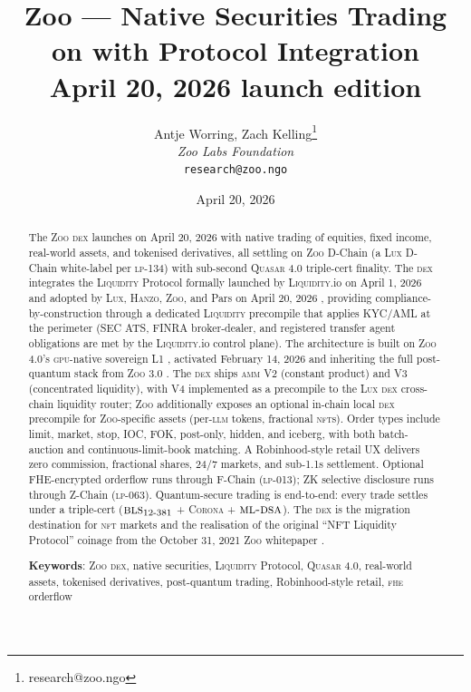 \documentclass[11pt,letterpaper]{article}
\title{\textbf{Zoo \DEX{} --- Native Securities Trading on \Lux{}
\Quasar{} with \Liquidity{} Protocol Integration}\\
\large April 20, 2026 launch edition}
\author{
Antje Worring, Zach Kelling\thanks{research@zoo.ngo}\\
\textit{Zoo Labs Foundation}\\
\texttt{research@zoo.ngo}
}
\date{April 20, 2026}
\newcommand{\Zoo}{\textsc{Zoo}}
\newcommand{\Lux}{\textsc{Lux}}
\newcommand{\Hanzo}{\textsc{Hanzo}}
\newcommand{\Quasar}{\textsc{Quasar}}
\newcommand{\Liquidity}{\textsc{Liquidity}}
\newcommand{\LLM}{\textsc{llm}}
\newcommand{\GPU}{\textsc{gpu}}
\newcommand{\AMM}{\textsc{amm}}
\newcommand{\DEX}{\textsc{dex}}
\newcommand{\NFT}{\textsc{nft}}
\newcommand{\FHE}{\textsc{fhe}}
\newcommand{\BLS}{\textsc{bls}}
\newcommand{\MLDSA}{\textsc{ml-dsa}}
\newcommand{\Corona}{\textsc{Corona}}
\begin{document}
\zoocoverpage

\begin{abstract}
\noindent The \Zoo{} \DEX{} launches on April 20, 2026 with native
trading of equities, fixed income, real-world assets, and tokenised
derivatives, all settling on \Zoo{} D-Chain (a \Lux{} D-Chain
white-label per \textsc{lp-134}) with sub-second \Quasar{} 4.0
triple-cert finality. The \DEX{} integrates the \Liquidity{} Protocol
formally launched by \Liquidity{}.io on April 1, 2026 and adopted by
\Lux{}, \Hanzo{}, \Zoo{}, and Pars on April 20, 2026
\cite{zoo-adopts-liquidity-protocol}, providing compliance-by-construction
through a dedicated \Liquidity{} precompile that applies KYC/AML at
the perimeter (SEC ATS, FINRA broker-dealer, and registered transfer
agent obligations are met by the \Liquidity{}.io control plane). The
architecture is built on \Zoo{} 4.0's \GPU{}-native sovereign L1
\cite{zoo-4-0}, activated February 14, 2026 and inheriting the full
post-quantum stack from \Zoo{} 3.0 \cite{zoo-3-0}. The \DEX{} ships
\AMM{} V2 (constant product) and V3 (concentrated liquidity), with V4
implemented as a precompile to the \Lux{} \DEX{} cross-chain
liquidity router; \Zoo{} additionally exposes an optional in-chain
local \DEX{} precompile for \Zoo{}-specific assets (per-\LLM{}
tokens, fractional \NFT{}s). Order types include limit, market,
stop, IOC, FOK, post-only, hidden, and iceberg, with both batch-auction
and continuous-limit-book matching. A Robinhood-style retail UX
delivers zero commission, fractional shares, 24/7 markets, and
sub-1.1s settlement. Optional FHE-encrypted orderflow runs through
F-Chain (\textsc{lp-013}); ZK selective disclosure runs through Z-Chain
(\textsc{lp-063}). Quantum-secure trading is end-to-end: every trade
settles under a triple-cert ($\BLS{}_{12\text{-}381}$ + \Corona{} +
$\MLDSA{}$). The \DEX{} is the migration destination for \NFT{}
markets and the realisation of the original ``NFT Liquidity
Protocol'' coinage from the October 31, 2021 \Zoo{} whitepaper
\cite{zoo-2021}.

\textbf{Keywords}: \Zoo{} \DEX{}, native securities, \Liquidity{}
Protocol, \Quasar{} 4.0, real-world assets, tokenised derivatives,
post-quantum trading, Robinhood-style retail, \FHE{} orderflow
\end{abstract}

\tableofcontents
\newpage











\end{document}
